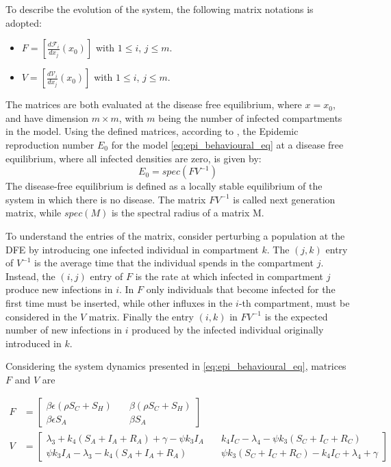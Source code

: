 To describe the evolution of the system, the following matrix notations is adopted: 
\begin{itemize}
	\item $F = \left[\frac{d \mathcal{F}_i}{d x_j}\left(x_0\right)\right]$ with $1 \le i$, $j \le m$.
	\item $V = \left[\frac{d \mathcal{V}_i}{d x_j}\left(x_0\right)\right]$ with $1 \le i$, $j \le m$.	
\end{itemize} 
The matrices are both evaluated at the disease free equilibrium, where $x = x_0$, and have dimension $m \times m$, with $m$ being the number of infected compartments in the model. 
Using the defined matrices, according to \cite{van_den_Driessche_2002,van_den_Driessche_2017}, the Epidemic reproduction number $E_0$ for the model \eqref{eq:epi_behavioural_eq} at a disease free equilibrium, where all infected densities are zero, is given by:
\begin{equation}
E_0 = spec(FV^{-1})
\label{eq:R_0_eqn}
\end{equation}
The disease-free equilibrium is defined as a locally stable equilibrium of the system in which there is no disease.
The matrix $FV^{-1}$ is called next generation matrix, while $spec(M)$ is the spectral radius of a matrix M.

To understand the entries of the matrix, consider perturbing a population at the DFE by introducing one infected individual in compartment $k$. The $(j,k)$ entry of $V^{-1}$ is the average time that the individual spends in the compartment $j$. Instead, the $(i,j)$ entry of $F$ is the  rate at which infected in compartment $j$ produce new infections in $i$. In $F$ only individuals that become infected for the first time must be inserted, while other influxes in the $i$-th compartment, must be considered in the $V$ matrix. Finally the entry $(i,k)$  in $FV^{-1}$ is the expected number of new infections in  $i$ produced by the infected individual originally introduced in $k$.

Considering the system dynamics presented in \eqref{eq:epi_behavioural_eq}, matrices $F$ and $V$ are

\begin{align*}
F & = 
\begin{bmatrix}
	\beta \epsilon(\rho S_C + S_H) \quad & \beta(\rho S_C + S_H) \\
	\beta \epsilon S_A \quad& \beta S_A
\end{bmatrix} \\
V & = 
\begin{bmatrix}
	\lambda_3+k_4(S_A+I_A+R_A)+\gamma-\psi k_3 I_A \quad & k_4 I_C-\lambda_4-\psi k_3 (S_C+I_C + R_C)  \\
	\psi k_3 I_A - \lambda_3 - k_4 (S_A + I_A + R_A) \quad & \psi k_3 (S_C + I_C + R_C) - k_4 I_C + \lambda_4 + \gamma
\end{bmatrix}
\label{eq:next_gen_matrices}
\end{align*}

